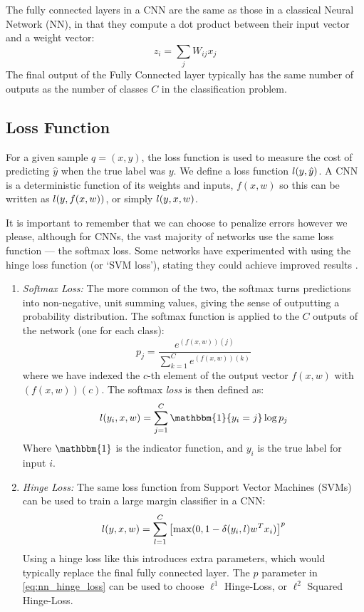   The fully connected layers in a CNN are the same as those in a classical
  Neural Network (NN), in that they compute a dot product between their input
  vector and a weight vector:
  \begin{equation}
    z_i = \sum_{j} W_{ij}x_j
  \end{equation}
  The final output of the Fully Connected layer typically has the same number
  of outputs as the number of classes $C$ in the classification problem.

\subsection{Loss Function}
  For a given sample $q=(x, y)$, the loss
  function is used to measure the cost of predicting $\hat{y}$ when the
  true label was $y$. We define a loss function $l (y, \hat{y})$. 
  A CNN is a deterministic
  function of its weights and inputs, $f(x,w)$ so this can be written as $l
  (y, f(x,w))$, or simply $l(y, x, w)$.
  
  It is important to remember that we can choose
  to penalize errors however we please, although for CNNs, the vast majority of
  networks use the same loss function --- the softmax loss. Some networks have
  experimented with using the hinge loss function (or `SVM loss'), stating they
  could achieve improved results \citep{gu_recent_2015,tang_deep_2013}. 
  \begin{enumerate}

  \item \emph{Softmax Loss:} The more common of the two, the softmax turns
    predictions into non-negative, unit summing values, giving the sense of
    outputting a probability distribution. The softmax function is applied to
    the $C$ outputs of the network (one for each class):
    \begin{equation}
      p_j = \frac{e^{(f(x, w))(j)}}{\sum\limits_{k=1}^{C}e^{(f(x,w))(k)}}
    \end{equation}
    where we have indexed the $c$-th element of the output vector $f(x,w)$ with
      $(f(x,w))(c)$. The softmax \emph{loss} is then defined as:
    \begin{equation}
      \loss (y_i, x, w)
      = \sum_{j=1}^{C} \mathbbm{1}\{y_i=j\} \log p_j
    \end{equation}
    Where $\mathbbm{1}$ is the indicator function, and $y_i$ is the true label
    for input $i$.

  \item \emph{Hinge Loss:} The same loss function from Support Vector
    Machines (SVMs) can be used to train a large margin classifier in a CNN:
    \begin{equation}
      l(y,x,w) = \sum_{l=1}^{C} 
        {\left[ \max(0, 1 - \delta(y_i,l) w^{T}x_{i}) \right]}^p \label{eq:nn_hinge_loss}
    \end{equation}
    Using a hinge loss like this introduces extra parameters, which would
    typically replace the final fully connected layer. The $p$ parameter in
    \autoref{eq:nn_hinge_loss} can be used to choose $\ell^1$ Hinge-Loss, or
    $\ell^2$ Squared Hinge-Loss. 

  \end{enumerate}
  


